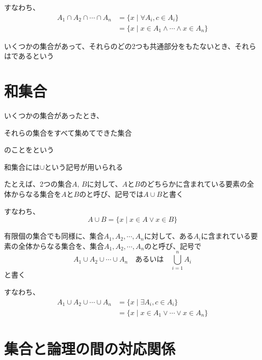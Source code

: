 \documentclass[b5paper,12pt]{jsarticle}
\begin{document}
\br

すなわち、
\begin{align*}
  A_1 \cap A_2 \cap \cdots \cap A_n
   & = \{x \mid \forall A_i , c \in A_i \}               \\
   & = \{x \mid x \in A_1 \land \cdots \land x \in A_n\}
\end{align*}

\sectionline

いくつかの集合があって、それらのどの2つも共通部分をもたないとき、それらはであるという

\sectionline
\section{和集合}

いくつかの集合があったとき、
\begin{shaded}
  それらの集合をすべて集めてできた集合
\end{shaded}
のことをという

和集合には$\cup$という記号が用いられる

\sectionline

たとえば、2つの集合$A,\,B$に対して、$A$と$B$のどちらかに含まれている要素の全体からなる集合を$A$と$B$のと呼び、記号では$A \cup B$と書く

\br

すなわち、
\begin{equation*}
  A \cup B = \{x \mid x \in A \lor x \in B\}
\end{equation*}

\sectionline

有限個の集合でも同様に、集合$A_1, A_2, \cdots , A_n$に対して、ある$A_i$に含まれている要素の全体からなる集合を、集合$A_1, A_2, \cdots , A_n$のと呼び、記号で
\begin{equation*}
  A_1 \cup A_2 \cup \cdots \cup A_n \quad \text{あるいは} \quad \bigcup_{i=1}^n A_i
\end{equation*}
と書く

\br

すなわち、
\begin{align*}
  A_1 \cup A_2 \cup \cdots \cup A_n
   & = \{x \mid \exists A_i , c \in A_i \}             \\
   & = \{x \mid x \in A_1 \lor \cdots \lor x \in A_n\}
\end{align*}

\sectionline
\section{集合と論理の間の対応関係}
\end{document}
